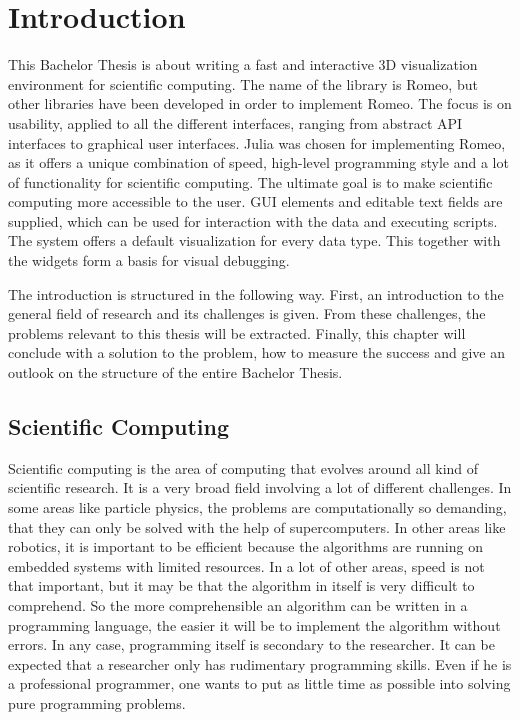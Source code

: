 \section{Introduction}
This Bachelor Thesis is about writing a fast and interactive 3D visualization environment for scientific computing.
The name of the library is Romeo, but other libraries have been developed in order to implement Romeo. 
The focus is on usability, applied to all the different interfaces, ranging from abstract API interfaces to graphical user interfaces. 
Julia was chosen for implementing Romeo, as it offers a unique combination of speed, high-level programming style and a lot of functionality for scientific computing.
The ultimate goal is to make scientific computing more accessible to the user.
\ac{GUI} elements and editable text fields are supplied, which can be used for interaction with the data and executing scripts.
The system offers a default visualization for every data type. This together with the widgets form a basis for visual debugging.

The introduction is structured in the following way.
First, an introduction to the general field of research and its challenges is given. 
From these challenges, the problems relevant to this thesis will be extracted.
Finally, this chapter will conclude with a solution to the problem, how to measure the success and give an outlook on the structure of the entire Bachelor Thesis.


\subsection{Scientific Computing}

Scientific computing is the area of computing that evolves around all kind of scientific research.
It is a very broad field involving a lot of different challenges. 
In some areas like particle physics, the problems are computationally so demanding, that they can only be solved with the help of supercomputers.
In other areas like robotics, it is important to be efficient because the algorithms are running on embedded systems with limited resources. 
In a lot of other areas, speed is not that important, but it may be that the algorithm in itself is very difficult to comprehend. 
So the more comprehensible an algorithm can be written in a programming language, the easier it will be to implement the algorithm without errors.
In any case, programming itself is secondary to the researcher.
It can be expected that a researcher only has rudimentary programming skills. 
Even if he is a professional programmer, one wants to put as little time as possible into solving pure programming problems.

